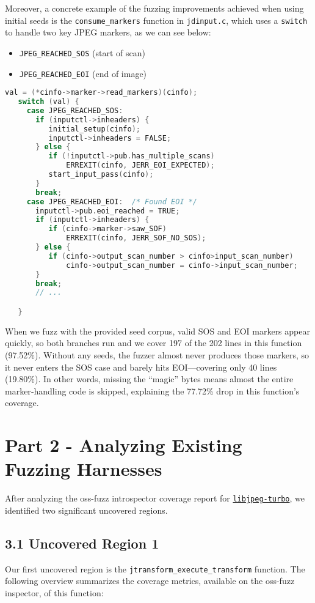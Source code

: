 \documentclass[12pt]{article}
\begin{document}
\noindent Moreover, a concrete example of the fuzzing improvements achieved when using initial seeds is the \texttt{consume\_markers} function in \texttt{jdinput.c}, which uses a \texttt{switch} to handle two key JPEG markers, as we can see below:
\begin{itemize}
  \item \texttt{JPEG\_REACHED\_SOS} (start of scan)
  \item \texttt{JPEG\_REACHED\_EOI} (end of image)
\end{itemize}

\begin{lstlisting}[language=C]
   val = (*cinfo->marker->read_markers)(cinfo);
   switch (val) {
     case JPEG_REACHED_SOS:   
       if (inputctl->inheaders) {
          initial_setup(cinfo);
          inputctl->inheaders = FALSE;
       } else {
          if (!inputctl->pub.has_multiple_scans)
     	      ERREXIT(cinfo, JERR_EOI_EXPECTED); 
          start_input_pass(cinfo);
       }
       break;
     case JPEG_REACHED_EOI:  /* Found EOI */
       inputctl->pub.eoi_reached = TRUE;
       if (inputctl->inheaders) {  
 	      if (cinfo->marker->saw_SOF)
    	      ERREXIT(cinfo, JERR_SOF_NO_SOS);
       } else {
  		  if (cinfo->output_scan_number > cinfo>input_scan_number)
              cinfo->output_scan_number = cinfo->input_scan_number;
       }
       break;
       // ...

   }
\end{lstlisting}

\noindent When we fuzz with the provided seed corpus, valid SOS and EOI markers appear quickly, so both branches run and we cover 197 of the 202 lines in this function (97.52\%). Without any seeds, the fuzzer almost never produces those markers, so it never enters the SOS case and barely hits EOI—covering only 40 lines (19.80\%). In other words, missing the “magic” bytes means almost the entire marker‐handling code is skipped, explaining the 77.72\% drop in this function's coverage. 

\section{Part 2 - Analyzing Existing Fuzzing Harnesses}
After analyzing the oss-fuzz introspector coverage report for \href{https://storage.googleapis.com/oss-fuzz-introspector/libjpeg-turbo/inspector-report/20250428/fuzz_report.html}{\texttt{libjpeg-turbo}}, we identified two significant uncovered regions.

\subsection*{3.1 Uncovered Region 1}
Our first uncovered region is the \texttt{jtransform\_execute\_transform} function. 
The following overview summarizes the coverage metrics, available on the oss-fuzz inspector, of this function:
\end{document}
